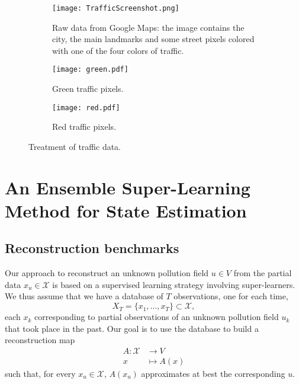 \documentclass[11pt,a4paper,twoside]{article}
\theoremstyle{definition}
\numberwithin{equation}{section}
\newcommand{\cX}{\ensuremath{\mathcal{X}}}
\newcommand{\<}{\langle}
\renewcommand{\>}{\rangle}
\begin{document}
\begin{figure}
      \centering
      \begin{subfigure}[b]{0.6\textwidth}
          \centering
          \texttt{[image: TrafficScreenshot.png]}
          \caption{Raw data from Google Maps: the image contains the city, the main landmarks and some street pixels colored with one of the four colors of traffic.}
          \label{fig:traffic-raw-data}
      \end{subfigure}
      \hfill
      \begin{subfigure}[b]{0.45\textwidth}
          \centering
          \texttt{[image: green.pdf]}
          \caption{Green traffic pixels. }
          \label{fig:green-traffic}
      \end{subfigure}
      \begin{subfigure}[b]{0.45\textwidth}
          \centering
          \texttt{[image: red.pdf]}
          \caption{Red traffic pixels. }
          \label{fig:red-traffic}
      \end{subfigure}
      \caption{Treatment of traffic data.}
      \label{fig:traffic-preprocess}
 \end{figure}
 



\section{An Ensemble Super-Learning Method for State Estimation}
\label{sec:rigorous}

\subsection{Reconstruction benchmarks}
Our approach to reconstruct an unknown pollution field $u\in V$ from the partial data $x_u\in \cX$ is based on a supervised learning strategy involving super-learners. We thus assume that we have a database of $T$ observations, one for each time,
$$
X_T = \{x_1,\dots, x_T\} \subset \cX,
$$
each $x_k$ corresponding to partial observations of an unknown pollution field $u_k$ that took place in the past. Our goal is to use the database to build a reconstruction map
\begin{align*}
A: \cX &\to V \\
x &\mapsto A(x)
\end{align*}
such that, for every $x_u\in \cX$, $A(x_u)$ approximates at best the corresponding $u$.
\end{document}
